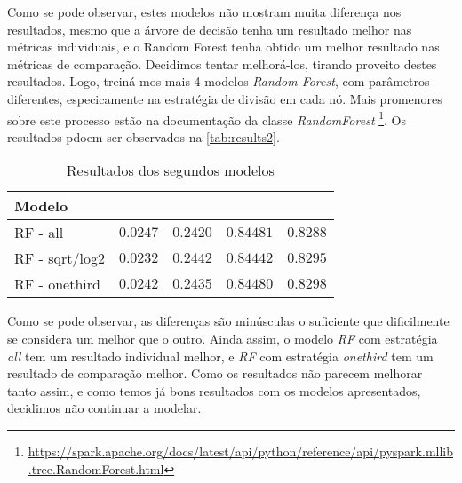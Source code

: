\documentclass[justified, 11pt]{scrartcl}
\begin{document}
  Como se pode observar, estes modelos não mostram muita diferença nos resultados, mesmo que a árvore de decisão tenha um resultado melhor nas métricas individuais, e o Random Forest tenha obtido um melhor resultado nas métricas de comparação. Decidimos tentar melhorá-los, tirando proveito destes resultados. Logo, treiná-mos mais 4 modelos \textit{Random Forest}, com parâmetros diferentes, especicamente na estratégia de divisão em cada nó. Mais promenores sobre este processo estão na documentação da classe \textit{RandomForest} \footnote{\url{https://spark.apache.org/docs/latest/api/python/reference/api/pyspark.mllib.tree.RandomForest.html}}. Os resultados pdoem ser observados na \autoref{tab:results2}.
  \begin{table}[H]
    \centering
    \caption{Resultados dos segundos modelos}
    \setlength{\extrarowheight}{0pt}
    \begin{tabulary}{\textwidth}{ L|r r r r }
      Modelo &  &  &  &  \\ \hline
      RF - all & $\boldsymbol{0.0247}$ & $\boldsymbol{0.2420}$ & $\boldsymbol{0.84481}$ & $0.8288$ \\
      RF - sqrt/log2 & $0.0232$ & $0.2442$ & $0.84442$ & $0.8295$ \\
      RF - onethird & $0.0242$ & $0.2435$ & $0.84480$ & $\boldsymbol{0.8298}$ \\
    \end{tabulary}
    \label{tab:results2}
  \end{table}

  Como se pode observar, as diferenças são minúsculas o suficiente que dificilmente se considera um melhor que o outro. Ainda assim, o modelo \textit{RF} com estratégia \textit{all} tem um resultado individual melhor, e \textit{RF} com estratégia \textit{onethird} tem um resultado de comparação melhor. Como os resultados não parecem melhorar tanto assim, e como temos já bons resultados com os modelos apresentados, decidimos não continuar a modelar.
\end{document}
